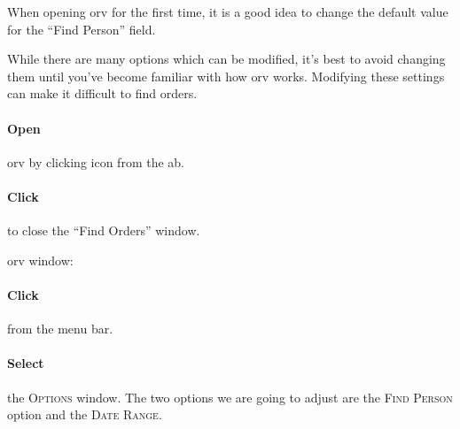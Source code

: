 When opening \gls{orv} for the first time, it is a good idea to change the default value for the ``Find Person'' field.

While there are many options which can be modified, it's best to avoid changing them until you've become familiar with how \gls{orv} works. Modifying these settings can make it difficult to find orders.

\paragraph{Open } \gls{orv} by clicking  icon from the \gls{ab}.

\paragraph{Click}  to close the ``Find Orders'' window.

 \gls{orv} window:
\begin{marginfigure}
\end{marginfigure}
\paragraph{Click}  from the menu bar.
\paragraph{Select} 

 the \textsc{Options} window. The two options we are going to adjust are the \textsc{Find Person} option and the \textsc{Date Range}.\\

